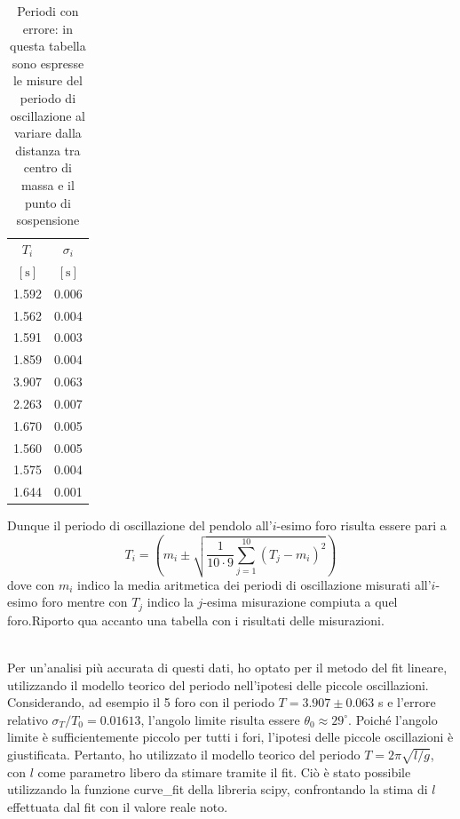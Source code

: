\documentclass{article}
\begin{document}
\begin{table}
    \centering
    \begin{tabular}{c c} \toprule
        $T_i$ & $\sigma_i$ \\
        $[\si{\second}]$ & $[\si{\second}]$ \\ \toprule
        1.592 & 0.006 \\
        1.562 & 0.004 \\
        1.591 & 0.003 \\
        1.859 & 0.004 \\
        3.907 & 0.063 \\
        2.263 & 0.007 \\
        1.670 & 0.005 \\
        1.560 & 0.005 \\
        1.575 & 0.004 \\
        1.644 & 0.001 \\ \hline
    \end{tabular}
    \caption{Periodi con errore: in questa tabella sono espresse le misure del periodo di oscillazione al variare dalla distanza tra centro di massa e il punto di sospensione}
    \label{tab:1}
\end{table}



\noindent Dunque il periodo di oscillazione del pendolo all'$i$-esimo foro risulta essere pari a
\begin{equation}
	T_i = \left( m_i \pm \sqrt{\frac{1}{10 \cdot 9}\sum_{j=1}^{10} (T_j - m_i)^2 } \right)
\end{equation}
dove con $m_i$ indico la media aritmetica dei periodi di oscillazione misurati all'$i$-esimo foro mentre con $T_j$ indico la $j$-esima misurazione compiuta a quel foro.Riporto qua accanto una tabella con i risultati delle misurazioni. \\\


\noindent Per un'analisi più accurata di questi dati, ho optato per il metodo del fit lineare, utilizzando il modello teorico del periodo nell'ipotesi delle piccole oscillazioni. Considerando, ad esempio il 5 foro con il periodo $T = 3.907 \pm 0.063$ s e l'errore relativo $\sigma_T/T_0 = 0.01613$, l'angolo limite risulta essere $\theta_0 \approx 29^\circ$. Poiché l'angolo limite è sufficientemente piccolo per tutti i fori, l'ipotesi delle piccole oscillazioni è giustificata. Pertanto, ho utilizzato il modello teorico del periodo $T = 2\pi\sqrt{l/g}$, con $l$ come parametro libero da stimare tramite il fit. Ciò è stato possibile utilizzando la funzione curve_fit della libreria scipy, confrontando la stima di $l$ effettuata dal fit con il valore reale noto.
\end{document}
